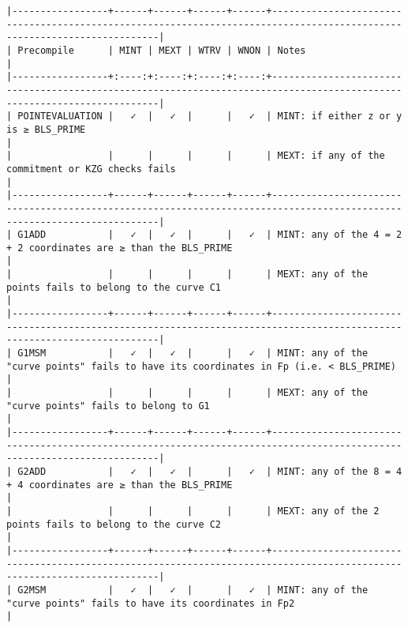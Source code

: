 \documentclass[varwidth=\maxdimen,margin=0.5cm,multi={verbatim}]{standalone}
\begin{document}
\begin{verbatim}
|-----------------+------+------+------+------+------------------------------------------------------------------------------------------------------------------------|
| Precompile      | MINT | MEXT | WTRV | WNON | Notes                                                                                                                  |
|-----------------+:----:+:----:+:----:+:----:+------------------------------------------------------------------------------------------------------------------------|
| POINTEVALUATION |   ✓  |   ✓  |      |   ✓  | MINT: if either z or y is ≥ BLS_PRIME                                                                                  |
|                 |      |      |      |      | MEXT: if any of the commitment or KZG checks fails                                                                     |
|-----------------+------+------+------+------+------------------------------------------------------------------------------------------------------------------------|
| G1ADD           |   ✓  |   ✓  |      |   ✓  | MINT: any of the 4 = 2 + 2 coordinates are ≥ than the BLS_PRIME                                                        |
|                 |      |      |      |      | MEXT: any of the points fails to belong to the curve C1                                                                |
|-----------------+------+------+------+------+------------------------------------------------------------------------------------------------------------------------|
| G1MSM           |   ✓  |   ✓  |      |   ✓  | MINT: any of the "curve points" fails to have its coordinates in Fp (i.e. < BLS_PRIME)                                 |
|                 |      |      |      |      | MEXT: any of the "curve points" fails to belong to G1                                                                  |
|-----------------+------+------+------+------+------------------------------------------------------------------------------------------------------------------------|
| G2ADD           |   ✓  |   ✓  |      |   ✓  | MINT: any of the 8 = 4 + 4 coordinates are ≥ than the BLS_PRIME                                                        |
|                 |      |      |      |      | MEXT: any of the 2 points fails to belong to the curve C2                                                              |
|-----------------+------+------+------+------+------------------------------------------------------------------------------------------------------------------------|
| G2MSM           |   ✓  |   ✓  |      |   ✓  | MINT: any of the "curve points" fails to have its coordinates in Fp2                                                   |

\end{verbatim}
\end{document}
